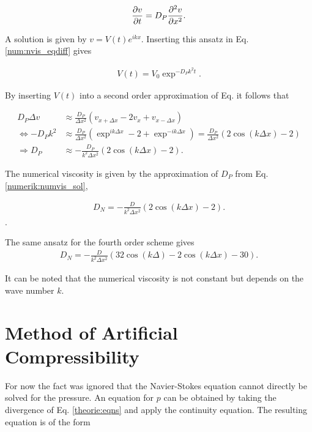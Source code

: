 \begin{align}
    \label{num:nvis_eqdiff}
    \pdn[v]{t} = D_P\pdn[^2v]{x^2}.
\end{align}

A solution is given by $v = V(t)e^{ikx}$. Inserting this ansatz in Eq. \ref{num:nvis_eqdiff} gives

\begin{align}
    V(t) = V_0 \exp^{-D_Pk^2t}.
\end{align}

By inserting $V(t)$ into a  second order approximation of Eq. \label{ref:nvis_eqdiff} it follows that

\begin{align}
                      D_P \Delta v  &\approx \frac{D_P}{\Delta x^2} \left(v_{x+\Delta x} - 2 v_x + v_{x - \Delta x}\right) \\
    \Leftrightarrow   -D_P k^2        &\approx \frac{D_P}{\Delta x^2} \left(\exp^{ik\Delta x} - 2 + \exp^{-ik\Delta x}\right) =   \frac{D_P}{\Delta x^2} \left(2\cos(k\Delta x) - 2\right)\\
    \Rightarrow   D_P      &\approx - \frac{D_P}{k^2 \Delta x^2} \left(2\cos(k\Delta x) - 2\right).
    \label{numerik:numvis_sol}
\end{align}

The numerical viscosity is given by the approximation of $D_P$  from Eq. \ref{numerik:numvis_sol},

\begin{align}
 \label{NUMERIC:NUMVIS}
    D_N = -\frac{D}{k^2 \Delta x^2} \left(2\cos(k\Delta x) - 2\right).
\end{align}.

The same ansatz for the fourth order scheme gives
\begin{align}
 \label{NUMERIC:NUMVIS2}
    D_N = -\frac{D}{k^2 \Delta x^2} \left(32\cos(k\Delta ) - 2\cos(k\Delta x) - 30\right).
\end{align}

It can be noted that the numerical viscosity is not constant but depends on the wave number $k$.
\clearpage


\section{Method of Artificial Compressibility}
\label{num:sec_articomp}

For now the fact was ignored that the Navier-Stokes equation cannot directly be solved for the pressure.
An equation for $p$ can be obtained by taking the divergence of Eq. \ref{theorie:eqns} and apply the continuity equation.
The resulting equation is of the form \citep{Lulff2011}


